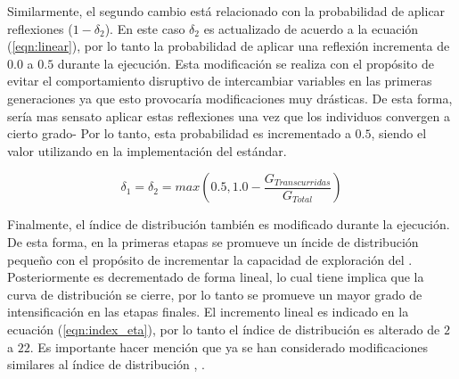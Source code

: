 Similarmente, el segundo cambio está relacionado con la probabilidad de aplicar reflexiones ($1 - \delta_2$).
%
En este caso $\delta_2$ es actualizado de acuerdo a la ecuación (\ref{eqn:linear}), por lo tanto la probabilidad de aplicar una reflexión incrementa de $0.0$ a $0.5$ durante la ejecución.
%
Esta modificación se realiza con el propósito de evitar el comportamiento disruptivo de intercambiar variables en las primeras generaciones ya que esto provocaría modificaciones muy drásticas.
%
De esta forma, sería mas sensato aplicar estas reflexiones una vez que los individuos convergen a cierto grado-
%
Por lo tanto, esta probabilidad es incrementado a $0.5$, siendo el valor utilizando en la implementación del \SBX{} estándar.

\begin{equation}\label{eqn:linear}
	\delta_1 = \delta_2 = max \left (0.5, 1.0 - \frac{G_{Transcurridas}}{G_{Total}} \right )
\end{equation}

Finalmente, el índice de distribución también es modificado durante la ejecución.
%
De esta forma, en la primeras etapas se promueve un íncide de distribución pequeño con el propósito de incrementar la capacidad de exploración del \SBX{}.
%
Posteriormente es decrementado de forma lineal, lo cual tiene implica que la curva de distribución se cierre, por lo tanto se promueve un mayor grado de intensificación en las etapas finales.
%
El incremento lineal es indicado en la ecuación (\ref{eqn:index_eta}), por lo tanto el índice de distribución es alterado de $2$ a $22$.
%
Es importante hacer mención que ya se han considerado modificaciones similares al índice de distribución \cite{zitzler1999multiobjective}, \cite{hamdan2012distribution}.
%

